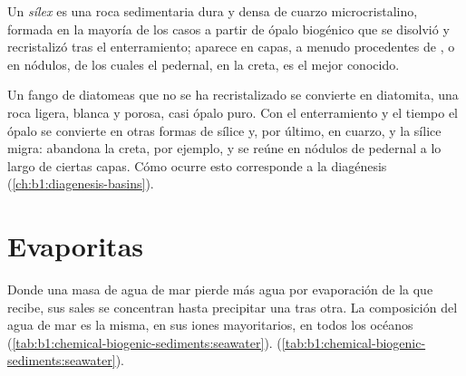 \begin{definition}[Sílex]\label{def:b1:chemical-biogenic-sediments:chert}
Un \emph{sílex} es una roca sedimentaria dura y densa de cuarzo microcristalino, formada en la mayoría de los casos a partir de ópalo biogénico que se disolvió y recristalizó tras el
enterramiento; aparece en capas, a menudo procedentes de , o en nódulos, de los cuales el pedernal, en la creta, es el mejor conocido.
\end{definition}

Un fango de diatomeas que no se ha recristalizado se convierte en diatomita, una roca ligera, blanca y porosa, casi ópalo puro. Con el enterramiento y el tiempo el ópalo se convierte en otras formas
de sílice y, por último, en cuarzo, y la sílice migra: abandona la creta, por ejemplo, y se reúne en nódulos de pedernal a lo largo de ciertas capas. Cómo ocurre esto corresponde a la diagénesis
(\cref{ch:b1:diagenesis-basins}).

\section{Evaporitas}\label{sec:b1:chemical-biogenic-sediments:evaporites}

Donde una masa de agua de mar pierde más agua por evaporación de la que recibe, sus sales se concentran hasta precipitar una tras otra. La composición del agua de mar es la misma, en sus iones
mayoritarios, en todos los océanos (\cref{tab:b1:chemical-biogenic-sediments:seawater}).
(\cref{tab:b1:chemical-biogenic-sediments:seawater}).

